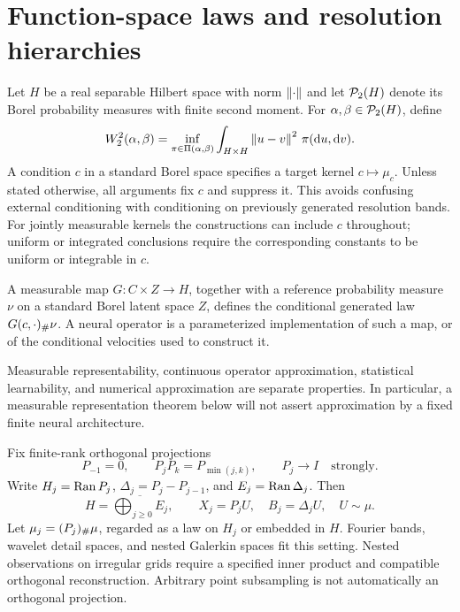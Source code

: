 \section{Function-space laws and resolution hierarchies}\label{sec:setting}
Let $H$ be a real separable Hilbert space with norm $\left\lVert\cdot\right\rVert$ and let $\mathcal P_2(H)$ denote its Borel probability measures with finite second moment. For $\alpha,\beta\in\mathcal P_2(H)$, define
\begin{equation}
 W_2^2(\alpha,\beta)=\inf_{\pi\in\Pi(\alpha,\beta)}
 \int_{H\times H}\left\lVert u-v\right\rVert^2\,\pi(\mathrm du,\mathrm dv).
\end{equation}
A condition $c$ in a standard Borel space specifies a target kernel $c\mapsto\mu_c$. Unless stated otherwise, all arguments fix $c$ and suppress it. This avoids confusing external conditioning with conditioning on previously generated resolution bands. For jointly measurable kernels the constructions can include $c$ throughout; uniform or integrated conclusions require the corresponding constants to be uniform or integrable in $c$.

\begin{definition}
A measurable map $G:C\times Z\to H$, together with a reference probability measure $\nu$ on a standard Borel latent space $Z$, defines the conditional generated law $G(c,\cdot)_{\#}\nu$. A neural operator is a parameterized implementation of such a map, or of the conditional velocities used to construct it.
\end{definition}
Measurable representability, continuous operator approximation, statistical learnability, and numerical approximation are separate properties. In particular, a measurable representation theorem below will not assert approximation by a fixed finite neural architecture.

Fix finite-rank orthogonal projections
\begin{equation}\label{eq:hierarchy}
 P_{-1}=0,\qquad P_jP_k=P_{\min(j,k)},\qquad P_j\to I\quad\text{strongly}.
\end{equation}
Write $H_j=\operatorname{Ran} P_j$, $\Delta_j=P_j-P_{j-1}$, and $E_j=\operatorname{Ran}\Delta_j$. Then
\begin{equation}
 H=\overline{\bigoplus_{j\ge0}E_j},\qquad
 X_j=P_jU,\quad B_j=\Delta_jU,\quad U\sim\mu.
\end{equation}
Let $\mu_j=(P_j)_{\#}\mu$, regarded as a law on $H_j$ or embedded in $H$. Fourier bands, wavelet detail spaces, and nested Galerkin spaces fit this setting. Nested observations on irregular grids require a specified inner product and compatible orthogonal reconstruction. Arbitrary point subsampling is not automatically an orthogonal projection.

